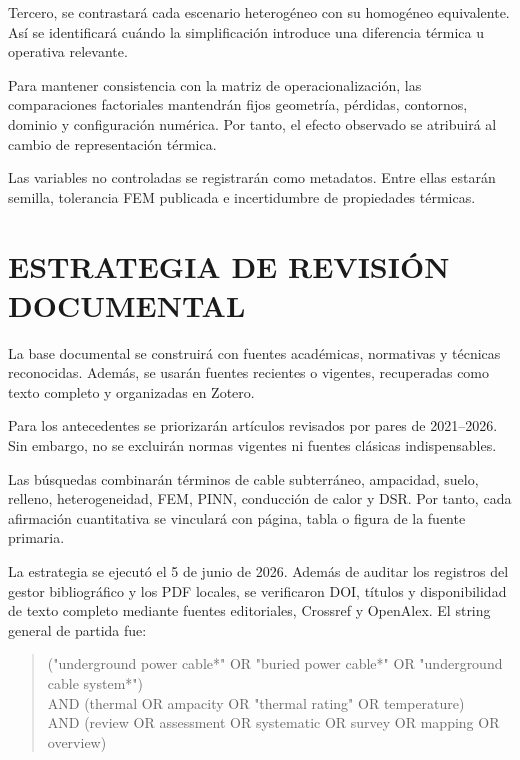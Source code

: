 \documentclass[11pt,a4paper,oneside]{report}
\newcommand{\tesisbodyfont}{\fontsize{11}{13.6}\selectfont}
\begin{document}
\begin{singlespace}
\begin{landscape}
Tercero, se contrastará cada escenario heterogéneo con su homogéneo equivalente. Así se identificará cuándo la simplificación introduce una diferencia térmica u operativa relevante.

Para mantener consistencia con la matriz de operacionalización, las comparaciones factoriales mantendrán fijos geometría, pérdidas, contornos, dominio y configuración numérica. Por tanto, el efecto observado se atribuirá al cambio de representación térmica.

Las variables no controladas se registrarán como metadatos. Entre ellas estarán semilla, tolerancia FEM publicada e incertidumbre de propiedades térmicas.

\end{landscape}
\clearpage
\tesisbodyfont

\section{ESTRATEGIA DE REVISIÓN DOCUMENTAL}
\thispagestyle{empty}

La base documental se construirá con fuentes académicas, normativas y técnicas reconocidas. Además, se usarán fuentes recientes o vigentes, recuperadas como texto completo y organizadas en Zotero.

Para los antecedentes se priorizarán artículos revisados por pares de 2021--2026. Sin embargo, no se excluirán normas vigentes ni fuentes clásicas indispensables.

Las búsquedas combinarán términos de cable subterráneo, ampacidad, suelo, relleno, heterogeneidad, FEM, PINN, conducción de calor y DSR. Por tanto, cada afirmación cuantitativa se vinculará con página, tabla o figura de la fuente primaria.

La estrategia se ejecutó el 5 de junio de 2026. Además de auditar los registros del gestor bibliográfico y los PDF locales, se verificaron DOI, títulos y disponibilidad de texto completo mediante fuentes editoriales, Crossref y OpenAlex. El string general de partida fue:

\begin{quote}\scriptsize\ttfamily\RaggedRight
("underground power cable*" OR "buried power cable*" OR "underground cable system*")\\
AND (thermal OR ampacity OR "thermal rating" OR temperature)\\
AND (review OR assessment OR systematic OR survey OR mapping OR overview)
\end{quote}


\end{singlespace}
\end{document}
